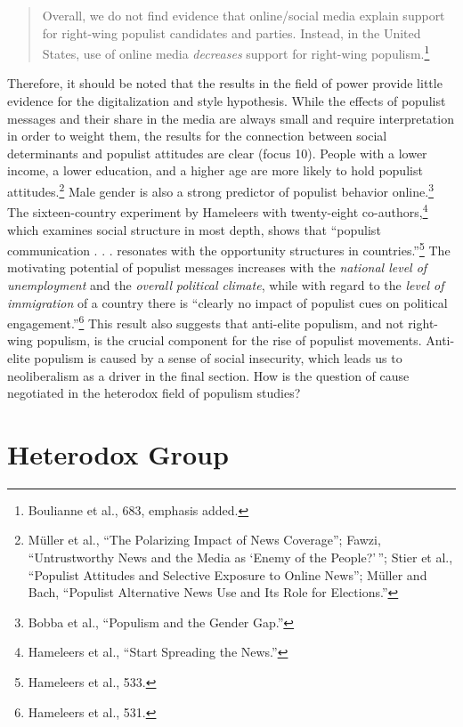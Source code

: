 \documentclass{tufte-handout}
\begin{document}
{{\begin{quote}
Overall, we do not find evidence that online/social media explain
support for right-wing populist candidates and parties. Instead, in the
United States, use of online media \emph{decreases} support for
right-wing populism.\footnote{Boulianne et al., 683, emphasis added.}
\end{quote}

\noindent Therefore, it should be noted that the results in the field of power
provide little evidence for the digitalization and style hypothesis.
While the effects of populist messages and their share in the media are
always small and require interpretation in order to weight them, the
results for the connection between social determinants and populist
attitudes are clear (focus 10). People with a lower income, a lower
education, and a higher age are more likely to hold populist
attitudes.\footnote{Müller et al., ``The Polarizing Impact of News
  Coverage''; Fawzi, ``Untrustworthy News and the Media as `Enemy of the
  People?'\,''; Stier et al., ``Populist Attitudes and Selective
  Exposure to Online News''; Müller and Bach, ``Populist Alternative
  News Use and Its Role for Elections.''} Male gender is also a strong
predictor of populist behavior online.\footnote{Bobba et al., ``Populism
  and the Gender Gap.''} The sixteen-country experiment by Hameleers
with twenty-eight co-authors,\footnote{Hameleers et al., ``Start
  Spreading the News.''} which examines social structure in most depth,
shows that ``populist communication . . . resonates with the opportunity
structures in countries.''\footnote{Hameleers et al., 533.} The
motivating potential of populist messages increases with the
\emph{national level of unemployment} and the \emph{overall}
\emph{political climate}, while with regard to the \emph{level of
immigration} of a country there is ``clearly no impact of populist cues
on political engagement.''\footnote{Hameleers et al., 531.} This result
also suggests that anti-elite populism, and not right-wing populism, is
the crucial component for the rise of populist movements. Anti-elite
populism is caused by a sense of social insecurity, which leads us to
neoliberalism as a driver in the final section. How is the question of
cause negotiated in the heterodox field of populism studies?

\hypertarget{heterodox-group}{%
\section{Heterodox Group}\label{heterodox-group}}

}}
\end{document}
